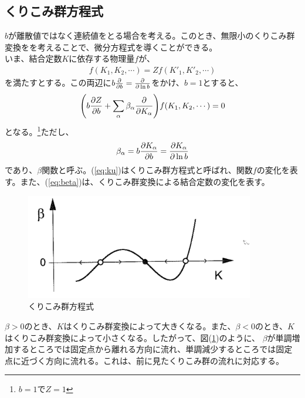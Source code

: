 \documentclass[a4paper,11pt]{jsarticle}
\numberwithin{equation}{section}
\begin{document}
\subsection{くりこみ群方程式}
$b$が離散値ではなく連続値をとる場合を考える。このとき、無限小のくりこみ群変換をを考えることで、微分方程式を導くことができる。\\
いま、結合定数$K$に依存する物理量$f$が、
\begin{align}
    f(K_1, K_2, \cdots) = Zf(K'_1, K'_2, \cdots)
\end{align}
を満たすとする。この両辺に$b\pdv{b} = \pdv{\ln b}$をかけ、$b=1$とすると、
\begin{align}
    \qty(b\pdv{Z}{b} + \sum_{\alpha} \beta_{\alpha} \pdv{K_{\alpha}} )f(K_1, K_2, \cdots) = 0 \label{eq:ku}
\end{align}
となる。\footnote{$b=1$で$Z=1$}ただし、
\begin{align}
    \beta_{\alpha} = b\pdv{K_{\alpha}}{b} = \pdv{K_{\alpha}}{\ln b} \label{eq:beta}
\end{align}
であり、$\beta$関数と呼ぶ。(\ref{eq:ku})はくりこみ群方程式と呼ばれ、関数$f$の変化を表す。また、(\ref{eq:beta})は、くりこみ群変換による結合定数の変化を表す。\\
\begin{figure}[H]
    \begin{center}
    \includegraphics[width=100mm]{k.png}
    \end{center}
    \caption{くりこみ群方程式}
    \label{fig:four}
\end{figure}
$\beta>0$のとき、$K$はくりこみ群変換によって大きくなる。また、$\beta<0$のとき、$K$はくりこみ群変換によって小さくなる。したがって、図(\ref{fig:four})のように、
$\beta$が単調増加するところでは固定点から離れる方向に流れ、単調減少するところでは固定点に近づく方向に流れる。これは、前に見たくりこみ群の流れに対応する。\\
\end{document}
